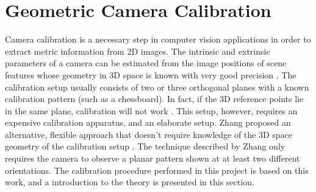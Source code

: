 
\section{Geometric Camera Calibration}
\label{app:cam_calibration}
Camera calibration is a necessary step in computer vision applications in order to extract metric information from 2D images. The intrinsic and extrinsic parameters of a camera can be estimated from the image positions of scene features whose geometry in 3D space is known with very good precision \cite{modernCV}. The calibration setup usually consists of two or three orthogonal planes with a known calibration pattern (such as a chessboard). In fact, if the 3D reference points lie in the same plane, calibration will not work \cite{3dvision}. This setup, however, requires an expensive calibration apparatus, and an elaborate setup. Zhang proposed an alternative, flexible approach that doesn't require knowledge of the 3D space geometry of the calibration setup \cite{flexCal}. The technique described by Zhang only requires the camera to observe a planar pattern shown at at least two different orientations. The calibration procedure performed in this project is based on this work, and a introduction to the theory is presented in this section. 
